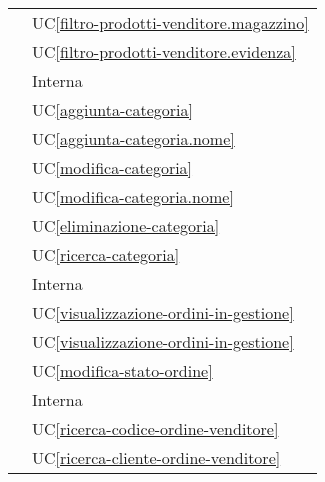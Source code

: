 \begin{longtable}{C{6cm} C{6cm}}
     & UC\ref{filtro-prodotti-venditore.magazzino} \\

     & UC\ref{filtro-prodotti-venditore.evidenza} \\

     & Interna \\

     & UC\ref{aggiunta-categoria} \\
        
     & UC\ref{aggiunta-categoria.nome} \\
        
     & UC\ref{modifica-categoria} \\
        
     & UC\ref{modifica-categoria.nome} \\

     & UC\ref{eliminazione-categoria} \\

     & UC\ref{ricerca-categoria} \\

     & Interna \\

     & UC\ref{visualizzazione-ordini-in-gestione} \\

     & UC\ref{visualizzazione-ordini-in-gestione} \\

     & UC\ref{modifica-stato-ordine} \\

     & Interna \\

     & UC\ref{ricerca-codice-ordine-venditore} \\
        
     & UC\ref{ricerca-cliente-ordine-venditore} \\
        

\end{longtable}
